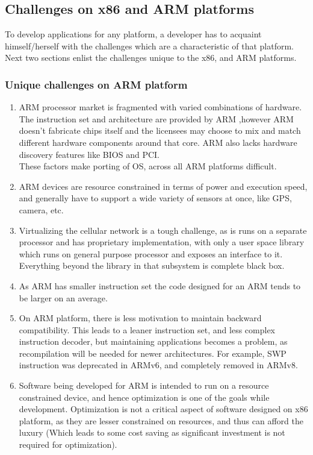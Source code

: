 \documentclass[seminar,twoside]{iitbreport}
\begin{document}
\subsection{Challenges on x86 and ARM platforms}
To develop applications for any platform, a developer has to acquaint himself/herself with the challenges which are a characteristic of that platform. Next two sections enlist the
challenges unique to the x86, and ARM platforms.

\subsubsection{Unique challenges on ARM platform}
\begin{enumerate}
 
\item ARM processor market is fragmented with varied combinations of hardware. The instruction set and architecture are provided by ARM ,however ARM doesn't fabricate chips itself and the licensees may choose to mix and match different hardware components around that core. ARM also lacks hardware discovery features like BIOS and PCI.
\\These factors make porting of OS, across all ARM platforms difficult.

\item ARM devices are resource constrained in terms of power and execution speed, and generally have to support a wide variety of sensors at once, like GPS, camera, etc.

\item Virtualizing the cellular network is a tough challenge, as is runs on a separate processor and has proprietary implementation, with only a user space library which runs on general purpose processor and exposes an interface to it. Everything beyond the library in that subsystem is complete black box.

\item As ARM has smaller instruction set the code designed for an ARM tends to be larger on an average.

\item On ARM platform, there is less motivation to maintain backward compatibility. This leads to a leaner instruction set, and less complex instruction decoder, but
maintaining applications becomes a problem, as recompilation will be needed for newer architectures. For example, SWP instruction was deprecated in ARMv6, and completely
removed in ARMv8.

\item Software being developed for ARM is intended to run on a resource constrained device, and hence optimization is one of the goals while development. Optimization is not a critical aspect of software designed on x86 platform, as they are lesser constrained on resources, and thus can afford the luxury (Which leads to some cost saving as significant investment is not required for optimization).

\end{enumerate}
\end{document}
